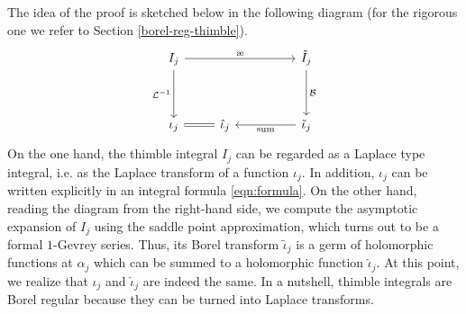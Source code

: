 \documentclass{article}
\theoremstyle{definition}
\newcommand{\series}[1]{\tilde{#1}}
\newcommand{\laplace}{\mathcal{L}}
\newcommand{\borel}{\mathcal{B}}
\newcommand{\aexp}{\text{\ae}}
\newtheorem{remark}[definition]{Remark}
\theoremstyle{plain}
\begin{document}
The idea of the proof is sketched below in the following diagram (for the rigorous one we refer to Section \ref{borel-reg-thimble}).
\[
\begin{tikzcd}
{I}_{j} \arrow[rrr,"\aexp"]\arrow[dd, swap,"\laplace^{-1} "] &  & & \tilde{I}_{j}\arrow[dd,"\borel"]\\
& & &\\
\iota_j \arrow[r,equal] & \hat{\iota}_j & &\tilde{\iota}_{j} \arrow[ll, "\text{sum}"]
\end{tikzcd}
\]
On the one hand, the thimble integral $I_j$ can be regarded as a Laplace type integral, i.e. as the Laplace transform of a function $\iota_j$. In addition, $\iota_j$ can be written explicitly in an integral formula \eqref{eqn:formula}. 
On the other hand, reading the diagram from the right-hand side, we compute the asymptotic expansion of $I_j$ using the saddle point approximation, which turns out to be a formal $1$-Gevrey series. Thus, its Borel transform $\series{\iota}_j$ is a germ of holomorphic functions at $\alpha_j$ which can be summed to a holomorphic function $\hat{\iota}_j$. At this point, we realize that $\iota_j$ and $\hat{\iota}_j$ are indeed the same. In a nutshell, thimble integrals are Borel regular because they can be turned into Laplace transforms.
%     
\end{document}

